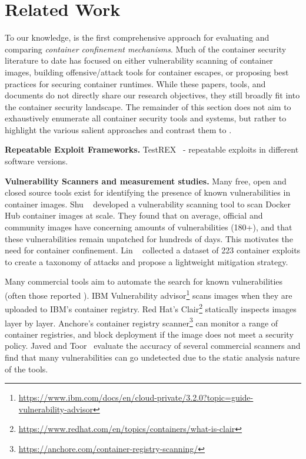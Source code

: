 \section{Related Work}%
\label{sec:related}


To our knowledge, \houdini{} is the first comprehensive approach for evaluating and comparing \textit{container confinement mechanisms}. Much of the container security literature to date has focused on either vulnerability scanning of container images, building offensive/attack tools for container escapes, or proposing best practices for securing container runtimes. While these papers, tools, and documents do not directly share our research objectives, they still broadly fit into the container security landscape. The remainder of this section does not aim to exhaustively enumerate all container security tools and systems, but rather to highlight the various salient approaches and contrast them to \houdini.

\noindent\textbf{Repeatable Exploit Frameworks.} 
TestREX~\cite{dashevskyi_testrex_2014} - repeatable exploits in different software versions. 

\noindent\textbf{Vulnerability Scanners and measurement studies.} Many free, open and closed source tools exist for identifying the presence of known vulnerabilities in container images. Shu \etal~\cite{shu_study_2017} developed a vulnerability scanning tool to scan Docker Hub container images at scale. They found that on average, official and community images have concerning amounts of vulnerabilities (180+), and that these vulnerabilities remain unpatched for hundreds of days. This motivates the need for container confinement. Lin \etal~\cite{lin_measurement_2018} collected a dataset of 223 container exploits to create a taxonomy of attacks and propose a lightweight mitigation strategy. 

Many commercial tools aim to automate the search for known vulnerabilities (often those reported ). IBM Vulnerability advisor\footnote{\url{https://www.ibm.com/docs/en/cloud-private/3.2.0?topic=guide-vulnerability-advisor}} scans images when they are uploaded to IBM's container registry. Red Hat's Clair\footnote{\url{https://www.redhat.com/en/topics/containers/what-is-clair}} statically inspects images layer by layer. Anchore's container registry scanner\footnote{\url{https://anchore.com/container-registry-scanning/}} can monitor a range of container registries, and block deployment if the image does not meet a security policy. Javed and Toor~\cite{javed_evaluation_2021} evaluate the accuracy of several commercial scanners and find that many vulnerabilities can go undetected due to the static analysis nature of the tools.

